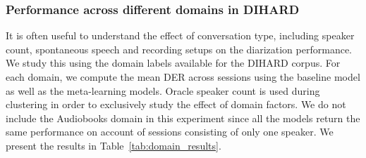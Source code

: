 


\subsubsection{Performance across different domains in DIHARD}

It is often useful to understand the effect of conversation type, including speaker count, spontaneous speech and recording setups on the diarization performance. We study this using the domain labels \cite{ryant2019second} available for the DIHARD corpus. For each domain, we compute the mean DER across sessions using the baseline model as well as the meta-learning models. Oracle speaker count is used during clustering in order to exclusively study the effect of domain factors. We do not include the Audiobooks domain in this experiment since all the models return the same performance on account of sessions consisting of only one speaker.
We present the results in \mbox{Table \ref{tab:domain_results}}.


